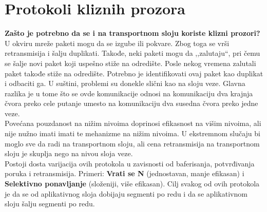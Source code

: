 \documentclass[a4paper]{article}
\begin{document}
\section{Protokoli kliznih prozora}
    \textbf{Zašto je potrebno da se i na transportnom sloju koriste klizni prozori?} 
    U okviru mreže paketi mogu da se izgube ili pokvare. Zbog toga se vrši retransmisija i šalju 
    duplikati. Takođe, neki paketi mogu da ,,zalutaju``, pri čemu se šalje novi paket koji uspešno 
    stiže na odredište. Posle nekog vremena zalutali paket takođe stiže na odredište. Potrebno je 
    identifikovati ovaj paket kao duplikat i odbaciti ga. U suštini, problemi su donekle slični kao
    na sloju veze. Glavna razlika je u tome što se ovde komunikacije odnosi na komunikaciju
    dva krajnja čvora preko cele putanje umesto na komunikaciju dva susedna čvora preko jedne veze.\\
    \indent Povećana pouzdanost na nižim nivoima doprinosi efikasnost na višim nivoima, ali nije
    nužno imati imati te mehanizme na nižim nivoima. U ekstremnom slučaju bi moglo sve da radi
    na transportnom sloju, ali cena retransmisija na transportnom sloju je skuplja nego
    na nivou sloja veze. \\
    \indent Postoji dosta varijacija ovih protokola u zavisnosti od baferisanja, potvrđivanja
    poruka i retransmisija. Primeri: \textbf{Vrati se N} (jednostavan, manje efikasan) i
    \textbf{Selektivno ponavljanje} (složeniji, više efikasan). Cilj svakog od ovih
    protokola je da se od aplikativnog sloja dobijaju segmenti po redu i da se aplikativnom
    sloju šalju segmenti po redu.
\end{document}
